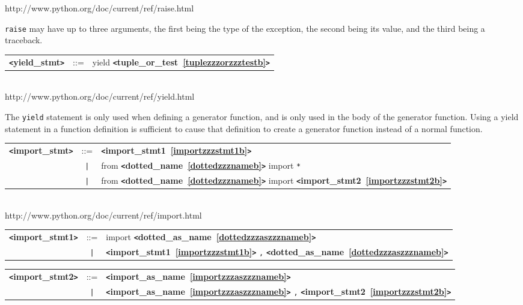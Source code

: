 \documentclass[12pt]{article}
\begin{document}
http://www.python.org/doc/current/ref/raise.html

\verb|raise| may have up to three arguments, the first being the type of the exception,
the second being its value, and the third being a traceback.

\label{yieldzzzstmtb}
\begin{tabular}{lcl}
{\bf \verb+<+yield\_stmt\verb+>+} & ::=  & yield {\bf \verb+<+tuple\_or\_test~\ref{tuplezzzorzzztestb}\verb+>+}  \\
\end{tabular} \\

http://www.python.org/doc/current/ref/yield.html

The \verb|yield| statement is only used when defining a generator function, 
and is only used in the body of the generator function. Using a yield 
statement in a function definition is sufficient to cause that definition 
to create a generator function instead of a normal function.

\label{importzzzstmtb}
\begin{tabular}{lcl}
{\bf \verb+<+import\_stmt\verb+>+} & ::=  & {\bf \verb+<+import\_stmt1~\ref{importzzzstmt1b}\verb+>+}  \\
 & \verb+|+  & from {\bf \verb+<+dotted\_name~\ref{dottedzzznameb}\verb+>+}  import \verb|*| \\
 & \verb+|+  & from {\bf \verb+<+dotted\_name~\ref{dottedzzznameb}\verb+>+}  import {\bf \verb+<+import\_stmt2~\ref{importzzzstmt2b}\verb+>+}  \\
\end{tabular} \\

http://www.python.org/doc/current/ref/import.html

\label{importzzzstmt1b}
\begin{tabular}{lcl}
{\bf \verb+<+import\_stmt1\verb+>+} & ::=  & import {\bf \verb+<+dotted\_as\_name~\ref{dottedzzzaszzznameb}\verb+>+}  \\
 & \verb+|+  & {\bf \verb+<+import\_stmt1~\ref{importzzzstmt1b}\verb+>+}  \verb|,| {\bf \verb+<+dotted\_as\_name~\ref{dottedzzzaszzznameb}\verb+>+}  \\
\end{tabular}

\label{importzzzstmt2b}
\begin{tabular}{lcl}
{\bf \verb+<+import\_stmt2\verb+>+} & ::=  & {\bf \verb+<+import\_as\_name~\ref{importzzzaszzznameb}\verb+>+}  \\
 & \verb+|+  & {\bf \verb+<+import\_as\_name~\ref{importzzzaszzznameb}\verb+>+}  \verb|,| {\bf \verb+<+import\_stmt2~\ref{importzzzstmt2b}\verb+>+}  \\
\end{tabular}
\end{document}
